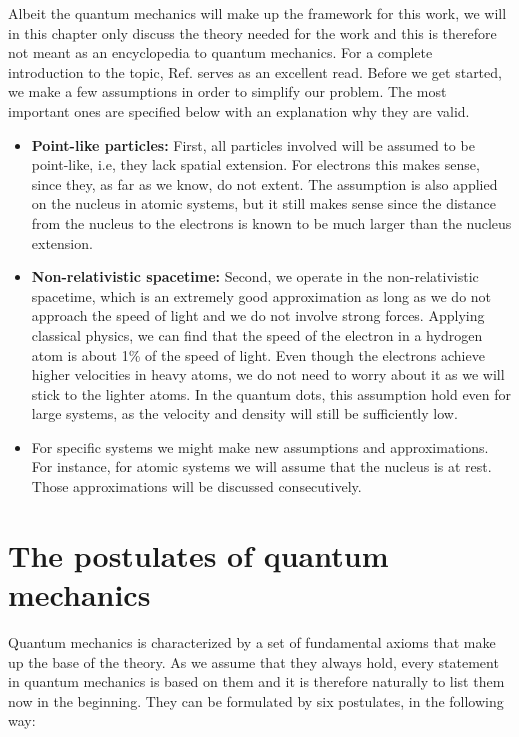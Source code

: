 Albeit the quantum mechanics will make up the framework for this work, we will in this chapter only discuss the theory needed for the work and this is therefore not meant as an encyclopedia to quantum mechanics. For a complete introduction to the topic, Ref. \cite{griffiths_introduction_2005} serves as an excellent read. Before we get started, we make a few assumptions in order to simplify our problem. The most important ones are specified below with an explanation why they are valid.

\begin{itemize}
	\item \textbf{Point-like particles:} First, all particles involved will be assumed to be point-like, i.e, they lack spatial extension. For electrons this makes sense, since they, as far as we know, do not extent. The assumption is also applied on the nucleus in atomic systems, but it still makes sense since the distance from the nucleus to the electrons is known to be much larger than the nucleus extension.
	
	\item \textbf{Non-relativistic spacetime:}  Second, we operate in the non-relativistic spacetime, which is an extremely good approximation as long as we do not approach the speed of light and we do not involve strong forces. Applying classical physics, we can find that the speed of the electron in a hydrogen atom is about 1\% of the speed of light. Even though the electrons achieve higher velocities in heavy atoms, we do not need to worry about it as we will stick to the lighter atoms. In the quantum dots, this assumption hold even for large systems, as the velocity and density will still be sufficiently low.
	
	\item For specific systems we might make new assumptions and approximations. For instance, for atomic systems we will assume that the nucleus is at rest. Those approximations will be discussed consecutively. 
\end{itemize}

\section{The postulates of quantum mechanics} \label{sec:postulates}
Quantum mechanics is characterized by a set of fundamental axioms that make up the base of the theory. As we assume that they always hold, every statement in quantum mechanics is based on them and it is therefore naturally to list them now in the beginning. They can be formulated by six postulates, in the following way:


